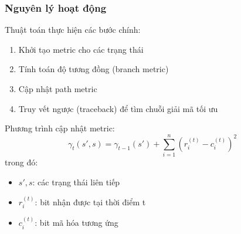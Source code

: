 \subsubsection*{Nguyên lý hoạt động}
Thuật toán thực hiện các bước chính:
\begin{enumerate}
	\item Khởi tạo metric cho các trạng thái
	\item Tính toán độ tương đồng (branch metric)
	\item Cập nhật path metric
	\item Truy vết ngược (traceback) để tìm chuỗi giải mã tối ưu
\end{enumerate}

Phương trình cập nhật metric:
\[
\gamma_t(s',s) = \gamma_{t-1}(s') + \sum_{i=1}^n (r_i^{(t)} - c_i^{(t)})^2
\]
trong đó:
\begin{itemize}
	\item $s', s$: các trạng thái liên tiếp
	\item $r_i^{(t)}$: bit nhận được tại thời điểm t
	\item $c_i^{(t)}$: bit mã hóa tương ứng
\end{itemize}